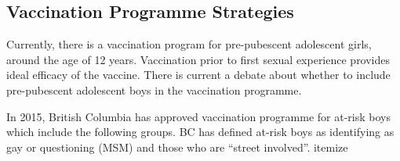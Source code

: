 \documentclass[12pt]{article}
\begin{document}
\subsection{Vaccination Programme Strategies}

Currently, there is a vaccination program for pre-pubescent adolescent girls, around the age of 12 years.  Vaccination prior to first sexual experience provides ideal efficacy of the vaccine. There is current a debate about whether to include pre-pubescent adolescent boys in the vaccination programme. 

In 2015, British Columbia has approved vaccination programme for at-risk boys which include the following groups.  BC has defined at-risk boys as identifying as gay or questioning (MSM) and those who are ``street involved''.
{itemize}


\newpage


\end{document}
